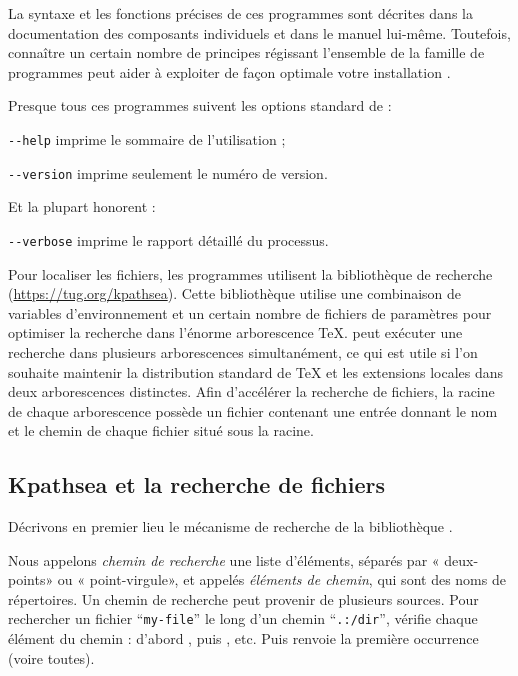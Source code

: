 \documentclass[german, english, french]{article}
\renewcommand{\samp}[1]{\enquote{\texttt{#1}}}
\begin{document}
La syntaxe et les fonctions précises de ces programmes sont décrites dans la
documentation des composants individuels et dans le manuel \Webc{} lui-même.
Toutefois, connaître un certain nombre de principes régissant l'ensemble de la
famille de programmes peut aider à exploiter de façon optimale votre
installation \Webc{}.

Presque tous ces programmes suivent les options standard de \GNU{} :
\begin{ttdescription}
\item[\texttt{-{}-help}] imprime le sommaire de l'utilisation ;
\item[\texttt{-{}-version}] imprime seulement le numéro de version.
\end{ttdescription}

Et la plupart honorent :
\begin{ttdescription}
\item[\texttt{-{}-verbose}] imprime le rapport détaillé du processus.
\end{ttdescription}

Pour localiser les fichiers, les programmes \Webc{} utilisent la bibliothèque de
recherche \KPS{} (\url{https://tug.org/kpathsea}). Cette bibliothèque utilise
une combinaison de variables d'environnement et un certain nombre de fichiers de
paramètres pour optimiser la recherche dans l'énorme arborescence \TeX{}.
\Webc{} peut exécuter une recherche dans plusieurs arborescences simultanément,
ce qui est utile si l'on souhaite maintenir la distribution standard de \TeX{}
et les extensions locales dans deux arborescences distinctes. Afin d'accélérer
la recherche de fichiers, la racine de chaque arborescence possède un fichier
 contenant une entrée donnant le nom et le chemin de chaque fichier
situé sous la racine.

\subsection{Kpathsea et la recherche de fichiers}
\label{sec:kpathsea}

Décrivons en premier lieu le mécanisme de recherche de la bibliothèque \KPS{}.

Nous appelons \emph{chemin de recherche} une liste d'éléments, séparés par
« deux-points» ou « point-virgule», et appelés \emph{éléments de chemin}, qui
sont des noms de répertoires.  Un chemin de recherche peut provenir de plusieurs
sources.  Pour rechercher un fichier \samp{my-file} le long d'un chemin
\samp{.:/dir}, \KPS{} vérifie chaque élément du chemin : d'abord
, puis , etc.  Puis \KPS{} renvoie la
première occurrence (voire toutes).
\end{document}
